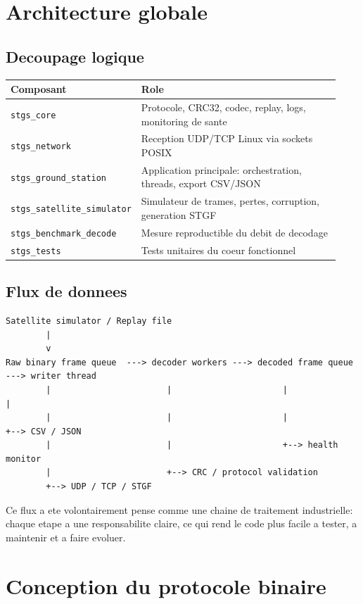 \documentclass[10pt,a4paper]{article}
\begin{document}
\section{Architecture globale}

\subsection{Decoupage logique}

\begin{longtable}{@{}p{0.25\linewidth}p{0.68\linewidth}@{}}
\toprule
Composant & Role \\
\midrule
\texttt{stgs\_core} & Protocole, CRC32, codec, replay, logs, monitoring de sante \\
\texttt{stgs\_network} & Reception UDP/TCP Linux via sockets POSIX \\
\texttt{stgs\_ground\_station} & Application principale: orchestration, threads, export CSV/JSON \\
\texttt{stgs\_satellite\_simulator} & Simulateur de trames, pertes, corruption, generation STGF \\
\texttt{stgs\_benchmark\_decode} & Mesure reproductible du debit de decodage \\
\texttt{stgs\_tests} & Tests unitaires du coeur fonctionnel \\
\bottomrule
\end{longtable}

\subsection{Flux de donnees}

\begin{verbatim}
Satellite simulator / Replay file
        |
        v
Raw binary frame queue  ---> decoder workers ---> decoded frame queue ---> writer thread
        |                       |                      |                     |
        |                       |                      |                     +--> CSV / JSON
        |                       |                      +--> health monitor
        |                       +--> CRC / protocol validation
        +--> UDP / TCP / STGF
\end{verbatim}

Ce flux a ete volontairement pense comme une chaine de traitement industrielle: chaque etape a une responsabilite claire, ce qui rend le code plus facile a tester, a maintenir et a faire evoluer.

\section{Conception du protocole binaire}
\end{document}
